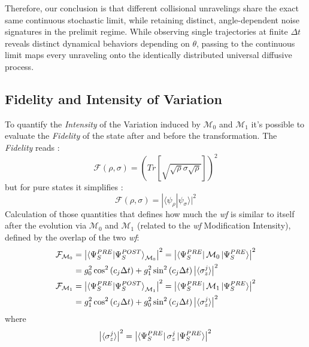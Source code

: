 \documentclass[a4paper,12pt]{article}
\begin{document}
Therefore, our conclusion is that different collisional unravelings share the exact same continuous stochastic limit, while retaining distinct, angle-dependent noise signatures in the prelimit regime. While observing single trajectories at finite $\Delta t$ reveals distinct dynamical behaviors depending on $\theta$, passing to the continuous limit maps every unraveling onto the identically distributed universal diffusive process.


\subsection{Fidelity and Intensity of Variation}
\label{subsub:Fidelity_and_Intensity_of_Variation}
To quantify the \textit{Intensity} of the Variation induced by $ \mathcal{M}_{0} $ and $ \mathcal{M}_{1} $ it's possible to evaluate the \textit{Fidelity} of the state after and before the transformation. The \textit{Fidelity} reads :
\begin{equation}
	\mathcal{F}\left( \rho, \sigma \right) = \left( Tr \left[ \sqrt{ \sqrt{\rho} \sigma \sqrt{\rho} }\right] \right)^{2}
	\label{eq:Fidelity}
\end{equation}
but for pure states it simplifies :
\begin{equation}
	\mathcal{F}\left( \rho, \sigma \right) = |\langle \psi_{\rho} | \psi_{\sigma} \rangle|^{2}
	\label{eq:Pure_Sates_Fidelity}
\end{equation}
Calculation of those quantities that defines how much the \textit{wf} is similar to itself after the evolution via $ \mathcal{M}_0 $ and $ \mathcal{M}_1 $ (related to the \textit{wf} Modification Intensity), defined by the overlap of the two \textit{wf}:
\begin{align}
	\mathcal{F}_{\mathcal{M}_{0}} &= \left| \braket{\Psi_{S}^{PRE} | \Psi_{S}^{POST}}_{\mathcal{M}_{0}} \right|^2 = \left| \bra{\Psi_{S}^{PRE}}\mathcal{M}_0 \ket{\Psi_{S}^{PRE}} \right|^2 \notag \\
	&= g_0^2 \cos^2{\left(c_j \Delta t \right)} + g_1^2 \sin^2{\left(c_j \Delta t \right)} \left| \braket{\sigma_{z}^{j}} \right|^2 \label{eq:fidelity_M0} \\
	\mathcal{F}_{\mathcal{M}_{1}} &= \left| \braket{\Psi_{S}^{PRE} | \Psi_{S}^{POST}}_{\mathcal{M}_{1}} \right|^2 = \left| \bra{\Psi_{S}^{PRE}}\mathcal{M}_1 \ket{\Psi_{S}^{PRE}} \right|^2 \notag \\
	&= g_1^2 \cos^2{\left(c_j \Delta t \right)} + g_0^2 \sin^2{\left(c_j \Delta t \right)} \left| \braket{\sigma_{z}^{j}} \right|^2 \label{eq:fidelity_M1}
\end{align}
where
\begin{equation*}
	\left| \braket{\sigma_{z}^{j}} \right|^2 = \left| \bra{\Psi_{S}^{PRE}} \sigma_{z}^{j} \ket{\Psi_{S}^{PRE}} \right|^2
\end{equation*}
\end{document}
